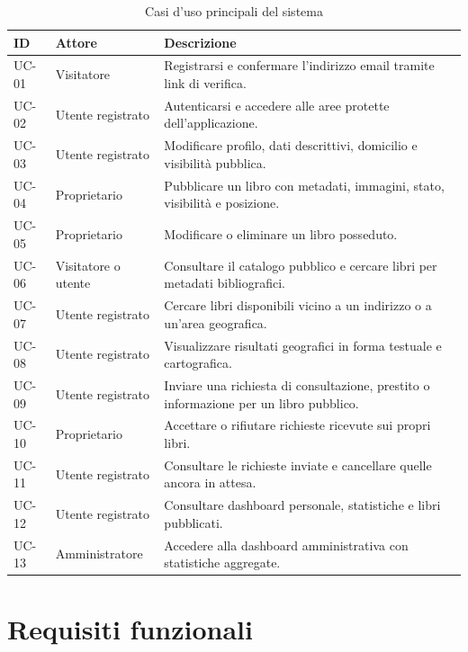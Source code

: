 \begin{table}[H]
    \centering
    \caption{Casi d'uso principali del sistema}
    \label{tab:casi-uso}
    \small
    \begin{tabularx}{\textwidth}{p{}p{}X}
        \toprule
        \textbf{ID} & \textbf{Attore} & \textbf{Descrizione} \\
        \midrule
        UC-01 & Visitatore & Registrarsi e confermare l'indirizzo email tramite link di verifica. \\
        UC-02 & Utente registrato & Autenticarsi e accedere alle aree protette dell'applicazione. \\
        UC-03 & Utente registrato & Modificare profilo, dati descrittivi, domicilio e visibilità pubblica. \\
        UC-04 & Proprietario & Pubblicare un libro con metadati, immagini, stato, visibilità e posizione. \\
        UC-05 & Proprietario & Modificare o eliminare un libro posseduto. \\
        UC-06 & Visitatore o utente & Consultare il catalogo pubblico e cercare libri per metadati bibliografici. \\
        UC-07 & Utente registrato & Cercare libri disponibili vicino a un indirizzo o a un'area geografica. \\
        UC-08 & Utente registrato & Visualizzare risultati geografici in forma testuale e cartografica. \\
        UC-09 & Utente registrato & Inviare una richiesta di consultazione, prestito o informazione per un libro pubblico. \\
        UC-10 & Proprietario & Accettare o rifiutare richieste ricevute sui propri libri. \\
        UC-11 & Utente registrato & Consultare le richieste inviate e cancellare quelle ancora in attesa. \\
        UC-12 & Utente registrato & Consultare dashboard personale, statistiche e libri pubblicati. \\
        UC-13 & Amministratore & Accedere alla dashboard amministrativa con statistiche aggregate. \\
        \bottomrule
    \end{tabularx}
\end{table}

\section{Requisiti funzionali}
\label{sec:requisiti-funzionali}

